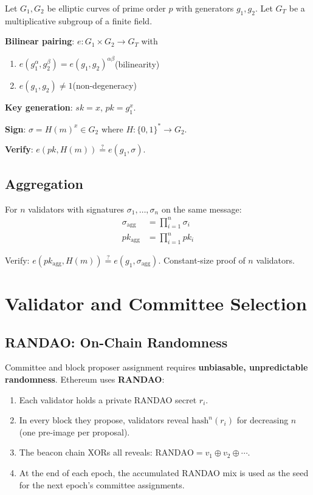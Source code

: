 \documentclass[12pt,a4paper,openany]{book}
\theoremstyle{definition}
\theoremstyle{plain}
\theoremstyle{remark}
\begin{document}
Let $G_1,G_2$ be elliptic curves of prime order $p$ with generators
$g_1,g_2$.  Let $G_T$ be a multiplicative subgroup of a finite field.

\textbf{Bilinear pairing}: $e:G_1\times G_2\to G_T$ with
\begin{enumerate}
  \item $e(g_1^\alpha,g_2^\beta)=e(g_1,g_2)^{\alpha\beta}$\quad (bilinearity)
  \item $e(g_1,g_2)\neq 1$\quad (non-degeneracy)
\end{enumerate}

\textbf{Key generation}: $sk=x$, $pk=g_1^x$.

\textbf{Sign}: $\sigma=H(m)^x\in G_2$ where $H:\{0,1\}^*\to G_2$.

\textbf{Verify}: $e(pk,H(m))\stackrel{?}{=}e(g_1,\sigma)$.

\subsection{Aggregation}

For $n$ validators with signatures $\sigma_1,\ldots,\sigma_n$ on the
same message:
\begin{align}
  \sigma_{\text{agg}} &= \prod_{i=1}^n \sigma_i \\
  pk_{\text{agg}}     &= \prod_{i=1}^n pk_i
\end{align}

Verify: $e(pk_{\text{agg}},H(m))\stackrel{?}{=}e(g_1,\sigma_{\text{agg}})$.
Constant-size proof of $n$ validators.

\section{Validator and Committee Selection}

\subsection{RANDAO: On-Chain Randomness}

Committee and block proposer assignment requires \textbf{unbiasable,
unpredictable randomness}.  Ethereum uses \textbf{RANDAO}:

\begin{enumerate}
  \item Each validator holds a private RANDAO secret $r_i$.
  \item In every block they propose, validators reveal
        $\mathrm{hash}^n(r_i)$ for decreasing $n$ (one pre-image per
        proposal).
  \item The beacon chain XORs all reveals: $\text{RANDAO} = v_1\oplus
        v_2\oplus\cdots$.
  \item At the end of each epoch, the accumulated RANDAO mix is used as
        the seed for the next epoch's committee assignments.
\end{enumerate}
\end{document}
